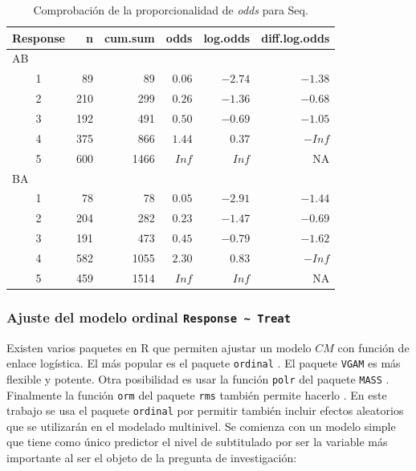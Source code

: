 \documentclass[
  12pt,
  a4paper,
  extrafontsizes,
  onecolumn,
  openright,
  table]{memoir}
\begin{document}
\hypertarget{tbl-po.check}{}
\begin{longtable}{crrrrr}
\caption{\label{tbl-po.check}Comprobación de la proporcionalidad de \emph{odds} para Seq. }\tabularnewline

\toprule
Response & n & cum.sum & odds & log.odds & diff.log.odds \\ 
\midrule
\multicolumn{6}{l}{AB} \\ 
\midrule
1 & 89 & 89 & $0.06$ & $-2.74$ & $-1.38$ \\ 
2 & 210 & 299 & $0.26$ & $-1.36$ & $-0.68$ \\ 
3 & 192 & 491 & $0.50$ & $-0.69$ & $-1.05$ \\ 
4 & 375 & 866 & $1.44$ & $0.37$ & $-Inf$ \\ 
5 & 600 & 1466 & $Inf$ & $Inf$ & NA \\ 
\midrule
\multicolumn{6}{l}{BA} \\ 
\midrule
1 & 78 & 78 & $0.05$ & $-2.91$ & $-1.44$ \\ 
2 & 204 & 282 & $0.23$ & $-1.47$ & $-0.69$ \\ 
3 & 191 & 473 & $0.45$ & $-0.79$ & $-1.62$ \\ 
4 & 582 & 1055 & $2.30$ & $0.83$ & $-Inf$ \\ 
5 & 459 & 1514 & $Inf$ & $Inf$ & NA \\ 
\bottomrule
\end{longtable}

\hypertarget{ajuste-del-modelo-ordinal-response-treat}{%
\subsubsection{\texorpdfstring{Ajuste del modelo ordinal
\texttt{Response\ \textasciitilde{}\ Treat}}{Ajuste del modelo ordinal Response \textasciitilde{} Treat}}\label{ajuste-del-modelo-ordinal-response-treat}}

Existen varios paquetes en R que permiten ajustar un modelo \(CM\) con
función de enlace logística. El más popular es el paquete
\texttt{ordinal} \autocite[ver][]{ordinalR}. El paquete \texttt{VGAM}
\autocite[ver][]{VGAMR} es más flexible y potente. Otra posibilidad es
usar la función \texttt{polr} del paquete \texttt{MASS}
\autocite[ver][]{MASSR}. Finalmente la función \texttt{orm} del paquete
\texttt{rms} también permite hacerlo \autocite[ver][]{harrell2015}. En
este trabajo se usa el paquete \texttt{ordinal}
\autocite[ver][]{ordinalR} por permitir también incluir efectos
aleatorios que se utilizarán en el modelado multinivel. Se comienza con
un modelo simple que tiene como único predictor el nivel de subtitulado
por ser la variable más importante al ser el objeto de la pregunta de
investigación:
\end{document}
